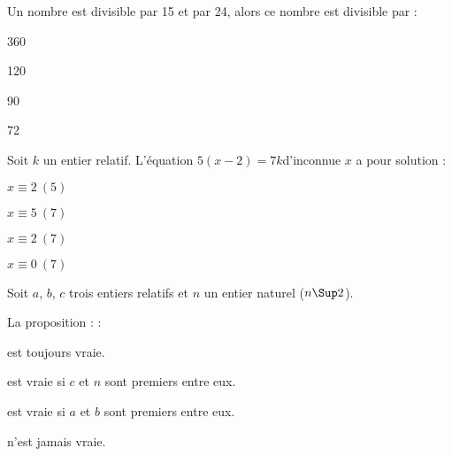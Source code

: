 \begin{QCM}
\begin{GroupeQCM}
\begin{exercice}
Un nombre est divisible par 15 et par 24, alors ce nombre est
divisible par :
\begin{ChoixQCM}{4}
\item 360
\item 120
\item 90
\item 72
\end{ChoixQCM}
\end{exercice}
\begin{corrige}
\end{corrige}
\begin{exercice}
Soit $k$ un entier relatif. L'équation $5(x-2)=7k$\enskip d'inconnue $x$ a pour solution :
\begin{ChoixQCM}{4}
\item $x\equiv2~(5)$
\item $x\equiv5~(7)$
\item $x\equiv2~(7)$
\item $x\equiv0~(7)$
\end{ChoixQCM}
\end{exercice}
\begin{corrige}
\end{corrige}
\begin{exercice}
Soit $a$, $b$, $c$ trois entiers relatifs et $n$ un entier naturel ($n\Sup2$).

La proposition :  :
\begin{ChoixQCM}{1}
\item est toujours vraie.
\item est vraie si $c$ et $n$ sont premiers entre eux.
\item est vraie si $a$ et $b$ sont premiers entre eux.
\item n'est jamais vraie.
\end{ChoixQCM}
\end{exercice}
\begin{corrige}
\end{corrige}
\end{GroupeQCM}
\end{QCM}

